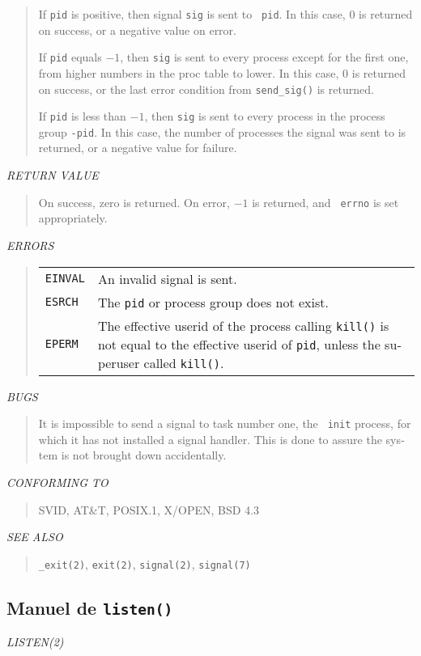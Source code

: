 \begin{appendix}
\begin{english}
\begin{quote}
	If {\tt pid} is positive, then signal {\tt sig} is sent to {\tt
	pid}. In this case, $0$ is returned on success, or a negative
	value on error.

	If {\tt pid} equals $-1$, then {\tt sig} is sent to every process
	except for the first one, from higher numbers in the proc table to
	lower. In this case, $0$ is returned on success, or the last error
	condition from {\tt send\_sig()} is returned.

	If {\tt pid} is less than $-1$, then {\tt sig} is sent to every
	process in the process group {\tt -pid}. In this case, the number
	 of processes the signal was sent to is returned, or a negative
	value for failure.
\end{quote}

{\sl RETURN VALUE}
\begin{quote}
	On success, zero is returned. On error, $-1$ is returned, and {\tt
	errno} is set appropriately.
\end{quote}

{\sl ERRORS}
\begin{quote}
\begin{tabular}{lp{8cm}}
	{\tt EINVAL}	&	An invalid signal is sent.\\
	{\tt ESRCH}		&	The {\tt pid} or process group does not exist.\\
	{\tt EPERM}		&	The effective userid of the process calling
						{\tt kill()} is not equal to the effective userid of
						{\tt pid}, unless the superuser called {\tt kill()}.
\end{tabular}
\end{quote}

{\sl BUGS}
\begin{quote}
	It is impossible to send a signal to task number one, the {\tt
	init} process, for which it has not installed a signal handler. 
	This is done to assure the system is not brought down
	accidentally.
\end{quote}

{\sl CONFORMING TO}
\begin{quote}
	SVID, AT\&T, POSIX.1, X/OPEN, BSD 4.3
\end{quote}

{\sl SEE ALSO}
\begin{quote}
	{\tt \_exit(2)}, {\tt exit(2)}, {\tt signal(2)}, {\tt signal(7)}
\end{quote}
\end{english}

\subsection{Manuel de {\tt listen()}}
\begin{english}
{\sl LISTEN(2)}\\


\end{english}
\end{appendix}
